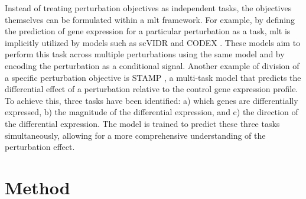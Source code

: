 \documentclass[12pt, a4paper]{article}
\begin{document}
Instead of treating perturbation objectives as independent tasks, the objectives themselves can be formulated within a \gls{mlt} framework. For example, by defining the prediction of gene expression for a particular perturbation as a task, \gls{mlt} is implicitly utilized by models such as scVIDR \cite{kanaGenerativeModelingSinglecell2023} and CODEX \cite{schrod2024codex}. These models aim to perform this task across multiple perturbations using the same model and by encoding the perturbation as a conditional signal. Another example of division of a specific perturbation objective is STAMP \cite{gaoSubtaskDecompositionbasedLearning2024}, a multi-task model that predicts the differential effect of a perturbation relative to the control gene expression profile. To achieve this, three tasks have been identified: a) which genes are differentially expressed, b) the magnitude of the differential expression, and c) the direction of the differential expression. The model is trained to predict these three tasks simultaneously, allowing for a more comprehensive understanding of the perturbation effect.





\section{Method}
\label{sec:method}
\end{document}
